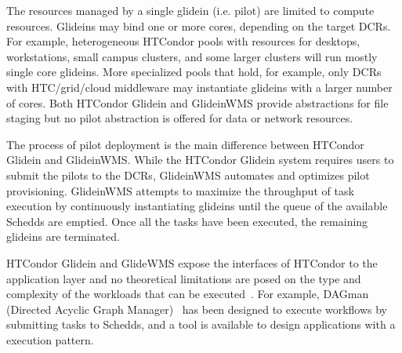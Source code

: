 \documentclass{sig-alternate}
\begin{document}

The resources managed by a single glidein (i.e. pilot) are limited to compute
resources. Glideins may bind one or more cores, depending on the target DCRs.
For example, heterogeneous HTCondor pools with resources for desktops,
workstations, small campus clusters, and some larger clusters will run mostly
single core glideins. More specialized pools that hold, for example, only DCRs
with HTC/grid/cloud middleware may instantiate glideins with a larger number of
cores. Both HTCondor Glidein and GlideinWMS provide abstractions for file
staging but no pilot abstraction is offered for data or network resources.

The process of pilot deployment is the main difference between HTCondor Glidein
and GlideinWMS. While the HTCondor Glidein system requires users to submit the
pilots to the DCRs, GlideinWMS automates and optimizes pilot provisioning.
GlideinWMS attempts to maximize the throughput of task execution by continuously
instantiating glideins until the queue of the available Schedds are
emptied. Once all the tasks have been executed, the remaining glideins are
terminated.


HTCondor Glidein and GlideWMS expose the interfaces of HTCondor to the
application layer and no theoretical limitations are posed on the type and
complexity of the workloads that can be executed~\cite{couvares2007workflow}.
For example, DAGman (Directed Acyclic Graph Manager)~\cite{frey2002condor} has
been designed to execute workflows by submitting tasks to Schedds, and a \MW
tool is available to design applications with a \MW execution pattern.



\end{document}
